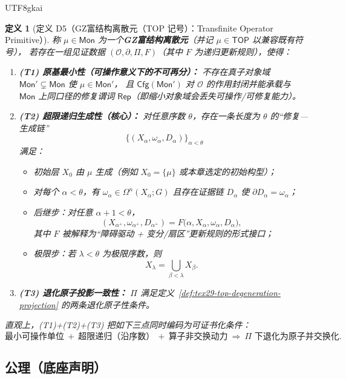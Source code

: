 \documentclass[12pt]{article}
\newtheorem{definition}{定义}[section]
\newcommand{\GZMonFull}{\texorpdfstring{GZ富结构离散元}{GZ富结构离散元}}
\newcommand{\GZMon}{\texorpdfstring{GZ富结构离散元}{GZ富结构离散元}}
\begin{document}
\begin{CJK*}{UTF8}{gkai}
\begin{definition}[定义 D5（\GZMonFull{}（TOP 记号）：Transfinite Operator Primitive）]
\label{def:tex29-top-primitive}
称 $\mu\in\mathsf{Mon}$ 为一个\textbf{\GZMon{}}（并记 $\mu\in\mathsf{TOP}$ 以兼容既有符号），
若存在一组见证数据 $(\mathcal{O},\partial,\Pi,F)$（其中 $F$ 为递归更新规则），使得：
\begin{enumerate}
  \item \textbf{(T1) 原基最小性（可操作意义下的不可再分）：}
  不存在真子对象域 $\mathsf{Mon}'\subsetneq\mathsf{Mon}$ 使 $\mu\in\mathsf{Mon}'$，
  且 $\mathsf{Cfg}(\mathsf{Mon}')$ 对 $\mathcal{O}$ 的作用封闭并能承载与 $\mathsf{Mon}$ 上同口径的修复谓词 $\mathsf{Rep}$（即缩小对象域会丢失可操作/可修复能力）。

  \item \textbf{(T2) 超限递归生成性（核心）：}
  对任意序数 $\theta$，存在一条长度为 $\theta$ 的“修复—生成链”
  \[
    \bigl\{(X_\alpha,\omega_\alpha,D_\alpha)\bigr\}_{\alpha<\theta}
  \]
  满足：
  \begin{itemize}
    \item 初始层 $X_0$ 由 $\mu$ 生成（例如 $X_0=\{\mu\}$ 或本章选定的初始构型）；
    \item 对每个 $\alpha<\theta$，有 $\omega_\alpha\in\Omega^n(X_\alpha;G)$ 且存在证据链 $D_\alpha$ 使 $\partial
      D_\alpha=\omega_\alpha$；
    \item 后继步：对任意 $\alpha+1<\theta$，
    \[
      (X_{\alpha^{+}},\omega_{\alpha^{+}},D_{\alpha^{+}})
      =F\bigl(\alpha, X_\alpha,\omega_\alpha,D_\alpha\bigr),
    \]
    其中 $F$ 被解释为“障碍驱动 + 变分/扇区”更新规则的形式接口；
    \item 极限步：若 $\lambda<\theta$ 为极限序数，则
    \[
      X_\lambda=\bigcup_{\beta<\lambda}X_\beta.
    \]
  \end{itemize}
  \item \textbf{(T3) 退化原子投影一致性：}
  $\Pi$ 满足定义~\ref{def:tex29-top-degeneration-projection} 的两条退化原子性条件。
\end{enumerate}
直观上，(T1)+(T2)+(T3) 把如下三点同时编码为可证书化条件：
\[
  \text{最小可操作单位}\ +\ \text{超限递归（沿序数）}\ +\ \text{算子非交换动力}\ \Rightarrow\ \Pi\text{ 下退化为原子并交换化}.
\]
\end{definition}

\subsection{公理（底座声明）}
\label{subsec:tex29-top-axioms}


\end{CJK*}
\end{document}
